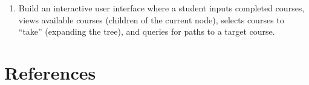 \documentclass[fontsize=11pt]{article}
\begin{document}
\begin{enumerate}
    \item[5.] Build an interactive user interface where a student inputs completed courses, views available courses (children of the current node), selects courses to ``take'' (expanding the tree), and queries for paths to a target course.
\end{enumerate}

\section*{References}



\end{document}
